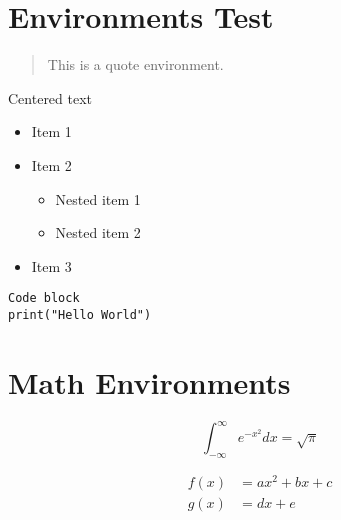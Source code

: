 \documentclass{article}
\begin{document}
\section{Environments Test}

\begin{quote}
This is a quote environment.
\end{quote}

\begin{center}
Centered text
\end{center}

\begin{itemize}
\item Item 1
\item Item 2
\begin{itemize}
\item Nested item 1
\item Nested item 2
\end{itemize}
\item Item 3
\end{itemize}

\begin{verbatim}
Code block
print("Hello World")
\end{verbatim}

\section{Math Environments}

\begin{equation}
\int_{-\infty}^{\infty} e^{-x^2} dx = \sqrt{\pi}
\end{equation}

\begin{align}
f(x) &= ax^2 + bx + c \\
g(x) &= dx + e
\end{align}
\end{document}
